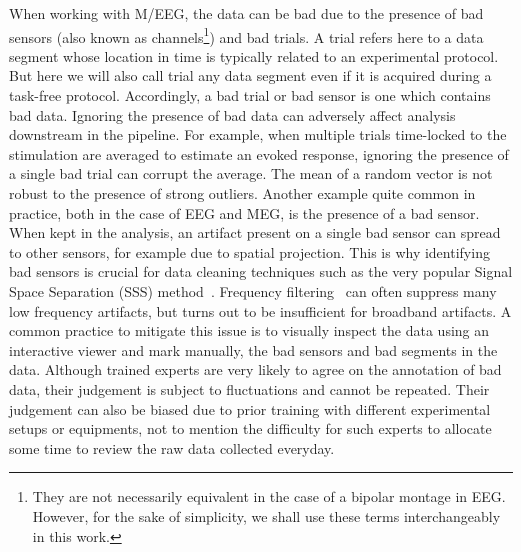 When working with M/EEG, the data can be bad due to the presence of bad sensors (also known as channels\footnote{They are not necessarily equivalent in the case of a bipolar montage in EEG. However, for the sake of simplicity, we shall use these terms interchangeably in this work.}) and bad trials.
A trial refers here to a data segment whose location in time is typically related to an experimental protocol. But here we will also call trial any data segment even if it is acquired during a task-free protocol.
Accordingly, a bad trial or bad sensor is one which contains bad data.
%
Ignoring the presence of bad data can adversely affect analysis downstream in the pipeline. For example, when multiple trials time-locked to the stimulation are averaged to estimate an evoked response,
ignoring the presence of a single bad trial can corrupt the average. The mean of a random vector is not robust to the presence of strong outliers. Another example quite common in practice, both in the case of EEG and MEG, is the presence of a bad sensor. When kept in the analysis, an artifact present on a single bad sensor can spread to other sensors, for example due to spatial projection. This is why identifying bad sensors is crucial for data cleaning techniques such as the very popular Signal Space Separation (SSS) method~\citep{taulu2004suppression}. Frequency filtering~\citep{widmann2015digital} can often suppress many low frequency artifacts, but turns out to be insufficient for broadband artifacts. A common practice to mitigate this issue is to visually inspect the data using an interactive viewer and mark manually, the bad sensors and bad segments in the data. Although trained experts are very likely to agree on the annotation of bad data, their judgement is subject to fluctuations and cannot be repeated. Their judgement can also be biased due to prior training with different experimental setups or equipments, not to mention the difficulty for such experts to allocate some time to review the raw data collected everyday.

